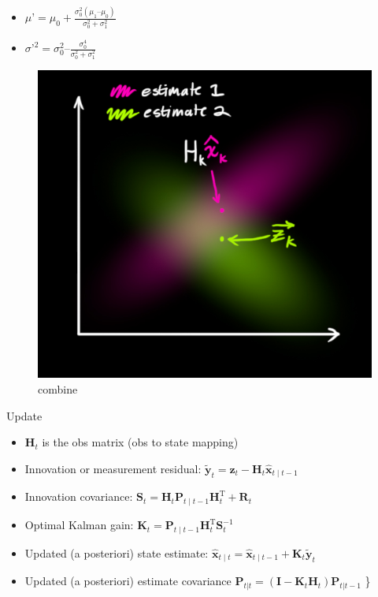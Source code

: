 \begin{frame}{}

\begin{itemize}
\tightlist
\item
  \(\mu’ = \mu_0 + \frac{\sigma_0^2 (\mu_1 – \mu_0)} {\sigma_0^2 + \sigma_1^2}\)
\item
  \({\sigma’}^2 = \sigma_0^2 – \frac{\sigma_0^4} {\sigma_0^2 + \sigma_1^2}\)
\end{itemize}

\begin{figure}
\centering
\includegraphics{combine.jpg}
\caption{combine}
\end{figure}

\end{frame}

\begin{frame}{Update}

\begin{itemize}
\tightlist
\item
  \(\mathbf{H}_t\) is the obs matrix (obs to state mapping)
\item
  Innovation or measurement residual:
  \(\tilde{\mathbf{y}}_t = \mathbf{z}_t - \mathbf{H}_t\hat{\mathbf{x}}_{t\mid t-1}\)
\item
  Innovation covariance:
  \(\mathbf{S}_t = \mathbf{H}_t \mathbf{P}_{t\mid t-1} \mathbf{H}_t^\mathrm{T} + \mathbf{R}_t\)
\item
  Optimal Kalman gain:
  \(\mathbf{K}_t = \mathbf{P}_{t\mid t-1}\mathbf{H}_t^\mathrm{T} \mathbf{S}_t^{-1}\)
\item
  Updated (a posteriori) state estimate:
  \(\hat{\mathbf{x}}_{t\mid t} = \hat{\mathbf{x}}_{t\mid t-1} + \mathbf{K}_t\tilde{\mathbf{y}}_t\)
\item
  Updated (a posteriori) estimate covariance
  \(\mathbf{P}_{t|t} = (\mathbf{I} - \mathbf{K}_t \mathbf{H}_t) \mathbf{P}_{t|t-1}\)
  \textbar{}\}
\end{itemize}

\end{frame}

